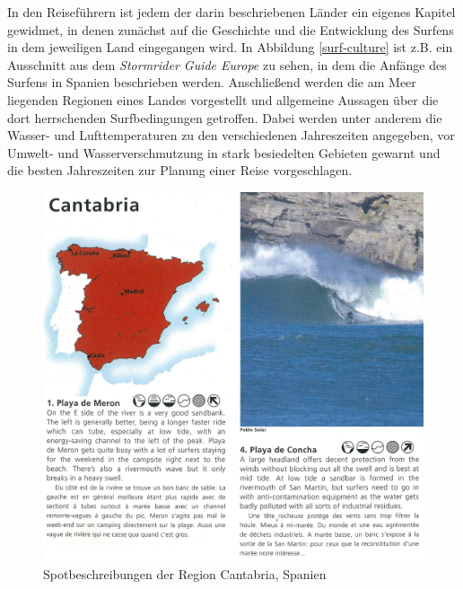 In den Reiseführern ist jedem der darin beschriebenen Länder ein
eigenes Kapitel gewidmet, in denen zunächst auf die Geschichte und die
Entwicklung des Surfens in dem jeweiligen Land eingegangen wird. In
Abbildung \ref{surf-culture} ist z.B. ein Ausschnitt aus dem
\textit{Stormrider Guide Europe} zu sehen, in dem die Anfänge des
Surfens in Spanien beschrieben werden. Anschließend werden die am Meer
liegenden Regionen eines Landes vorgestellt und allgemeine Aussagen
über die dort herrschenden Surfbedingungen getroffen. Dabei werden
unter anderem die Wasser- und Lufttemperaturen zu den verschiedenen
Jahreszeiten angegeben, vor Umwelt- und Wasserverschmutzung in stark
besiedelten Gebieten gewarnt und die besten Jahreszeiten zur Planung
einer Reise vorgeschlagen.

\begin{figure}[h]
  \includegraphics[width=\textwidth]{bilder/spot-descriptions}
  \caption{Spotbeschreibungen der Region Cantabria, Spanien}
  \label{spot-descriptions}
\end{figure}

